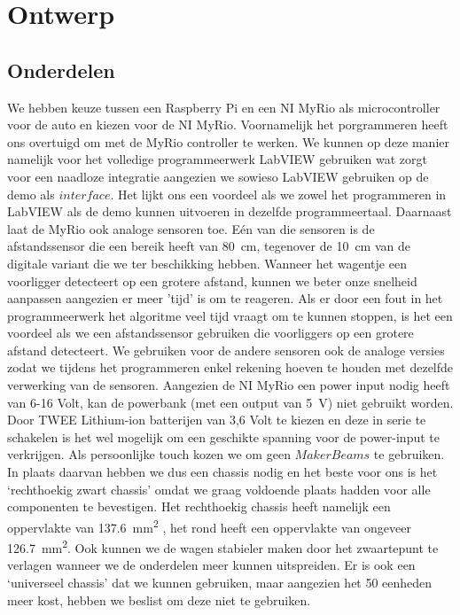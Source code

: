 \documentclass[a4paper,twoside,kulak]{kulakreport}
\begin{document}
	 
\newpage
	
	\section{Ontwerp}
	\subsection{Onderdelen}
	We hebben keuze tussen een Raspberry Pi en een NI MyRio als microcontroller voor de auto en kiezen voor de NI MyRio. Voornamelijk het porgrammeren heeft ons overtuigd om met de MyRio controller te werken. 
	We kunnen op deze manier namelijk voor het volledige programmeerwerk LabVIEW gebruiken wat zorgt voor een naadloze integratie aangezien we sowieso LabVIEW gebruiken op de demo als $interface$. Het lijkt ons een voordeel als we zowel het programmeren in LabVIEW als de demo kunnen uitvoeren in dezelfde programmeertaal. 
	Daarnaast laat de MyRio ook analoge sensoren toe. 
	Eén van die sensoren is de afstandssensor die een bereik heeft van 80~cm, tegenover de 10~cm van de digitale variant die we ter beschikking hebben. Wanneer het wagentje een voorligger detecteert op een grotere afstand, kunnen we beter onze snelheid aanpassen aangezien er meer 'tijd' is om te reageren. Als er door een fout in het programmeerwerk het algoritme veel tijd vraagt om te kunnen stoppen, is het een voordeel als we een afstandssensor gebruiken die voorliggers op een grotere afstand detecteert. 
	We gebruiken voor de andere sensoren ook de analoge versies zodat we tijdens het programmeren enkel rekening hoeven te houden met dezelfde verwerking van de sensoren. 
	Aangezien de NI MyRio een power input nodig heeft van 6-16 Volt, kan de powerbank (met een output van 5~V) niet gebruikt worden.  Door TWEE Lithium-ion batterijen van 3,6 Volt te kiezen en deze in serie te schakelen is het wel mogelijk om een geschikte spanning voor de power-input te verkrijgen.
	\bigskip
	Als persoonlijke touch kozen we om geen $MakerBeams$ te gebruiken.
	In plaats daarvan hebben we dus een chassis nodig en het beste voor ons is het `rechthoekig zwart chassis' omdat we graag voldoende plaats hadden voor alle componenten te bevestigen. Het rechthoekig chassis heeft namelijk een oppervlakte van \SI{137.6}{\milli\metre\squared} , het rond heeft een oppervlakte van ongeveer \SI{126.7}{\milli\metre\squared}. 
	Ook kunnen we de wagen stabieler maken door het zwaartepunt te verlagen wanneer we de onderdelen meer kunnen uitspreiden. 
	Er is ook een `universeel chassis' dat we kunnen gebruiken, maar aangezien het 50 eenheden meer kost, hebben we beslist om deze niet te gebruiken. 
\end{document}
